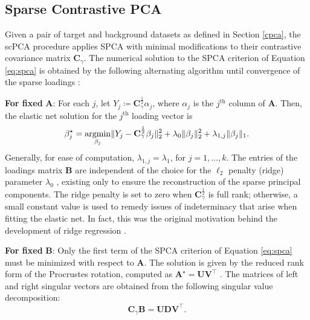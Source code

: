 \subsection{Sparse Contrastive PCA}

Given a pair of target and background datasets as defined in Section \ref{cpca},
the scPCA procedure applies SPCA with minimal modifications to their contrastive covariance matrix $\mathbf{C}_\gamma$. The numerical solution to the SPCA criterion of Equation
\eqref{eq:spca} is obtained by the following alternating algorithm
until convergence of the sparse loadings \citep{Zou2006}:

\textbf{For fixed} $\mathbf{A}$: For each $j$, let
$Y_j \coloneqq \mathbf{C}_\gamma^{\frac{1}{2}}\alpha_j$, where $\alpha_j$ is
the $j^{\text{th}}$ column of $\mathbf{A}$. Then, the elastic net solution for
the $j^{\text{th}}$ loading vector is
\begin{equation*}
  \beta_j^\star = \operatorname*{argmin}_{\beta_j} \lVert Y_j - \mathbf{C}_\gamma^{\frac{1}{2}}
  \beta_j \rVert_2^2 + \lambda_0 \lVert \beta_j \rVert_2^2 + \lambda_{1, j}
  \lVert \beta_j \rVert_1.
\end{equation*}
Generally, for ease of computation, $\lambda_{1, j} = \lambda_1$, for
$j=1, \ldots, k$. The entries of the loadings matrix $\mathbf{B}$ are independent of
the choice for the $\ell_2$ penalty (ridge) parameter $\lambda_0$
\citep{Zou2006}, existing only to ensure the reconstruction of the sparse
principal components. The ridge penalty is set to zero when
$\mathbf{C}^{\frac{1}{2}}_\gamma$ is full rank; otherwise, a small constant
value is used to remedy issues of indeterminacy that arise when fitting the
elastic net. In fact, this was the original motivation
behind the development of ridge regression \citep{Hoerl1970}.

\textbf{For fixed} $\mathbf{B}$: Only the first term of the SPCA criterion of
Equation \eqref{eq:spca} must be minimized with respect to $\mathbf{A}$. The
solution is given by the reduced rank form of the Procrustes rotation, computed
as $\mathbf{A}^\star = \mathbf{U}\mathbf{V}^\top$ \citep{Zou2006}. The matrices
of left and right singular vectors are obtained from the following singular
value decomposition:
\begin{equation*}
  \mathbf{C}_\gamma\mathbf{B} = \mathbf{U}\mathbf{D}\mathbf{V}^\top.
\end{equation*}

